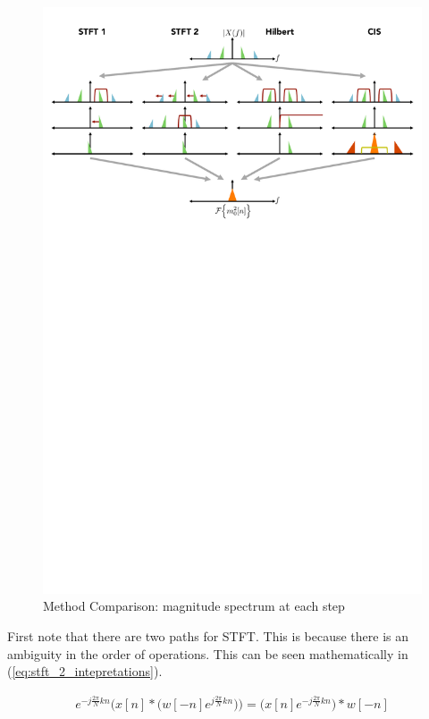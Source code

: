 \documentclass [11pt, proquest,oneside] {ganter_thesis}[2015/03/03]
\begin{document}
\begin{figure}[!ht]
  \centering
    \includegraphics[width=1.0\textwidth]{STFTvsHILBERTvsCIS}   
    \caption{Method Comparison: magnitude spectrum at each step}\label{fig:all_the_same}
\end{figure}

First note that there are two paths for STFT.  This is because there is an ambiguity in the order of operations.  This can be seen mathematically in (\ref{eq:stft_2_intepretations}).

\begin{align}
\label{eq:stft_2_intepretations}
e^{-j\frac{2\pi}{N}kn} \Bigg( x[n] * \Big( w[-n]e^{j\frac{2\pi}{N}kn} \Big) \Bigg) = \Big( x[n] e^{-j\frac{2\pi}{N}kn} \Big) * w[-n]
\end{align}
\end{document}
